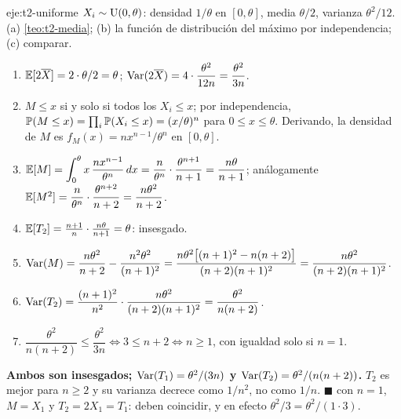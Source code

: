 \begin{solucion}{eje:t2-uniforme}
\datos $X_i\sim\operatorname{U}(0,\theta)$: densidad $1/\theta$ en $[0,\theta]$, media $\theta/2$, varianza $\theta^{2}/12$.
\planteamiento (a) \cref{teo:t2-media}; (b) la función de distribución del máximo por independencia; (c) comparar.
\pasos
\begin{enumerate}[label=\arabic*.]
  \item $\mathbb{E}[2\overline{X}]=2\cdot\theta/2=\theta$; $\operatorname{Var}(2\overline{X})=4\cdot\dfrac{\theta^{2}}{12n}=\dfrac{\theta^{2}}{3n}$.
  \item $M\le x$ si y solo si todos los $X_i\le x$; por independencia, $\mathbb{P}(M\le x)=\prod_i\mathbb{P}(X_i\le x)=(x/\theta)^{n}$ para $0\le x\le\theta$. Derivando, la densidad de $M$ es $f_M(x)=nx^{n-1}/\theta^{n}$ en $[0,\theta]$.
  \item $\mathbb{E}[M]=\displaystyle\int_0^{\theta}x\,\frac{nx^{n-1}}{\theta^{n}}\,dx=\frac{n}{\theta^{n}}\cdot\frac{\theta^{n+1}}{n+1}=\frac{n\theta}{n+1}$; análogamente $\mathbb{E}[M^{2}]=\dfrac{n}{\theta^{n}}\cdot\dfrac{\theta^{n+2}}{n+2}=\dfrac{n\theta^{2}}{n+2}$.
  \item $\mathbb{E}[T_2]=\frac{n+1}{n}\cdot\frac{n\theta}{n+1}=\theta$: insesgado.
  \item $\operatorname{Var}(M)=\dfrac{n\theta^{2}}{n+2}-\dfrac{n^{2}\theta^{2}}{(n+1)^{2}}=\dfrac{n\theta^{2}\bigl[(n+1)^{2}-n(n+2)\bigr]}{(n+2)(n+1)^{2}}=\dfrac{n\theta^{2}}{(n+2)(n+1)^{2}}$.
  \item $\operatorname{Var}(T_2)=\dfrac{(n+1)^{2}}{n^{2}}\cdot\dfrac{n\theta^{2}}{(n+2)(n+1)^{2}}=\dfrac{\theta^{2}}{n(n+2)}$.
  \item $\dfrac{\theta^{2}}{n(n+2)}\le\dfrac{\theta^{2}}{3n}\iff3\le n+2\iff n\ge1$, con igualdad solo si $n=1$.
\end{enumerate}
\resultado \textbf{Ambos son insesgados; $\operatorname{Var}(T_1)=\theta^{2}/(3n)$ y $\operatorname{Var}(T_2)=\theta^{2}/(n(n+2))$.} $T_2$ es mejor para $n\ge2$ y su varianza decrece como $1/n^{2}$, no como $1/n$. $\blacksquare$
\comprobacion con $n=1$, $M=X_1$ y $T_2=2X_1=T_1$: deben coincidir, y en efecto $\theta^{2}/3=\theta^{2}/(1\cdot3)$.
\end{solucion}

